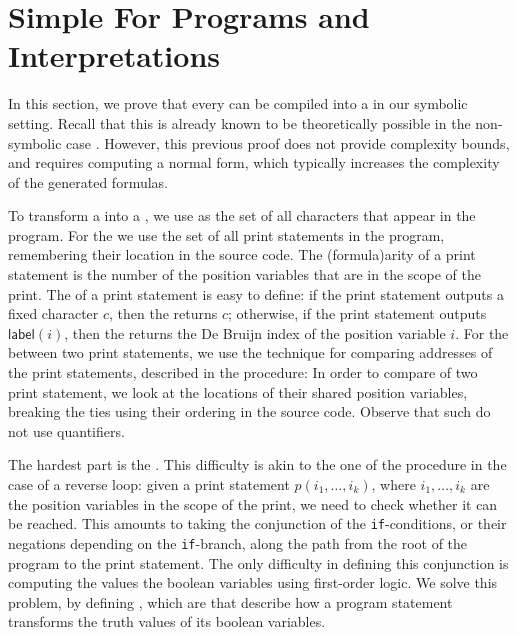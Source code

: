 \section{Simple For Programs and Interpretations}
\label{sec:low-level}

In this section, we prove that every  can be compiled
into a  in our symbolic setting. Recall that
this is already known to be theoretically possible in the non-symbolic case
\cite{bojanczyk2018polyregular}. However, this previous proof does not provide
complexity bounds, and requires computing a normal form, which typically
increases the complexity of the generated formulas.

To transform a  into a ,
we use as  the set of all
characters that appear in the program. For the  we use the set of all print statements in the program, remembering their
location in the source code. The \kl(formula){arity} of a print statement
is the number of the position variables that are in the scope of the print.
The  of a print statement is easy to define: if
the print statement outputs a fixed character $c$, then the  returns $c$; otherwise,
if the print statement outputs $\mathsf{label}(i)$,
then the  returns the De Bruijn index \cite{DEBRUJ72}
of the position variable $i$. For the  between two print statements,
we use the technique for comparing addresses of the print statements, 
described in the  procedure:
In order to compare of two print statement, we look 
at the locations of their shared position variables,
breaking the ties using their ordering in the source code.
Observe that such  do not use quantifiers.

The hardest part is the . This difficulty is akin to the one of the
 procedure in the case of a reverse loop: given a print
statement $p(i_1, \dots, i_k)$, where $i_1, \dots, i_k$ are the position
variables in the scope of the print, we need to check whether it can
be reached. This amounts to taking the conjunction of the \texttt{if}-conditions, 
or their negations depending on the \texttt{if}-branch, along the path
from the root of the program to the print statement.
The only difficulty in defining this conjunction is
computing the values the boolean variables using 
first-order logic. We solve this problem, by defining
, which are  
that describe how a program statement transforms
the truth values of its boolean variables.

